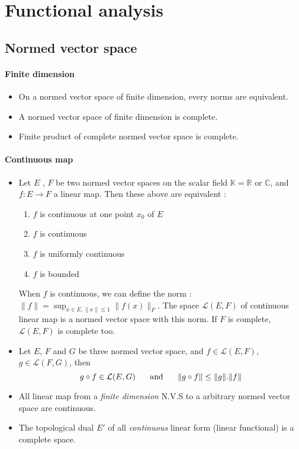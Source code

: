 \documentclass[a4paper,10pt]{article}
\begin{document}
 
 
 
 
 
 
 
 
 
 
 
 
\section{Functional analysis}
\subsection{Normed vector space} 
\paragraph{Finite dimension}
\begin{itemize}
 \item On a normed vector space of finite dimension, every norms are equivalent.
 \item A normed vector space of finite dimension is complete.
 \item Finite product of complete normed vector space is complete.
\end{itemize}

\paragraph{Continuous map}
\begin{itemize}
 \item Let $E$ , $F$ be two normed vector spaces on the scalar field $\mathbb{K} = \mathbb{R} \text{ or } \mathbb{C} $, and $f:E\longrightarrow F$ a linear map. Then these above are equivalent :
 \begin{enumerate}
  \item $f$ is continuous at one point $x_0$ of $E$
  \item $f$ is continuous
  \item $f$ is uniformly continuous
  \item $f$ is bounded
 \end{enumerate}
 When $f$ is continuous, we can define the norm : $\|f\| = \sup_{x\in E, \|x\|\leq 1} \|f(x)\|_{F}$. The space $\mathcal{L}(E,F)$ of continuous linear map is a normed vector space with this norm. If $F$ is complete, $\mathcal{L}(E,F)$ is complete too.
 \item Let $E$, $F$ and $G$ be three normed vector space, and $f \in \mathcal{L}(E,F)$, $g \in \mathcal{L}(F,G)$, then
 \[ g\circ f \in \mathcal{L}(E,G) \hspace{5mm} \text{ and } \hspace{5mm} \| g\circ f\| \leq \|g\|.\|f\| \]
 \item All linear map from a \textit{finite dimension} N.V.S to a arbitrary normed vector space are continuous.
 \item The topological dual $E'$ of all \textit{continuous} linear form (linear functional) is a complete space.
\end{itemize}
\end{document}
